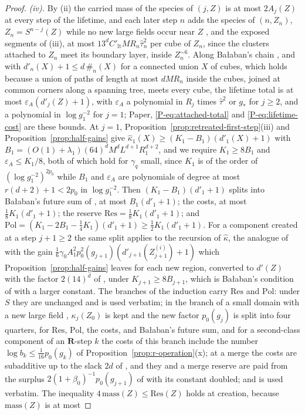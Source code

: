 \documentclass[11pt]{preprint}
\numberwithin{equation}{section}
\theoremstyle{definition}
\theoremstyle{remark}
\theoremstyle{plain}
\begin{document}
\begin{proof}
\emph{(iv).} By (ii) the carried mass of the species of $(j, Z)$ is at most $2A_j(Z)$ at every step of the lifetime, and each later step $n$ adds the species of $(n, Z_n)$, $Z_n = S^{n-j}(Z)$ while no new large fields occur near $Z$ \cite[(1.83), p.~385]{BalabanLFR2}, and the exposed segments of (iii), at most $13^dC'_{\mathrm{lt}}MR_n\hat\tau_n^2$ per cube of $Z_n$, since the clusters attached to $Z_n$ meet its boundary layer, inside $Z_n^{\sim6}$. Along Ba{\l}aban's chain \cite[pp.~384--385]{BalabanLFR2}, and with $d'_n(X) + 1 \leq d\,\#_n(X)$ for a connected union $X$ of cubes, which holds because a union of paths of length at most $dMR_n$ inside the cubes, joined at common corners along a spanning tree, meets every cube, the lifetime total is at most $\varepsilon_A(d'_j(Z) + 1)$, with $\varepsilon_A$ a polynomial in $R_j$ times $\hat\tau^2$ or $g_*$ for $j \geq 2$, and a polynomial in $\log g_1^{-2}$ for $j = 1$; Paper, \eqref{P-eq:attached-total} and \eqref{P-eq:lifetime-cost} are these bounds. At $j = 1$, Proposition~\ref{prop:retreated-first-step}(iii) and Proposition~\ref{prop:half-gains} give $\hat\kappa_1(X) \geq (K_1 - B_1)(d'_1(X) + 1)$ with $B_1 = (O(1) + \lambda_1)(64)^dM^dL^{d+1}R_1^{d+2}$, and we require $K_1 \geq 8B_1$ and $\varepsilon_A \leq K_1/8$, both of which hold for $\gamma_q$ small, since $K_1$ is of the order of $(\log g_1^{-2})^{2p_0}$ while $B_1$ and $\varepsilon_A$ are polynomials of degree at most $r(d + 2) + 1 < 2p_0$ in $\log g_1^{-2}$. Then $(K_1 - B_1)(d'_1 + 1)$ splits into Ba{\l}aban's future sum of \cite[(1.81)]{BalabanLFR2}, at most $B_1(d'_1 + 1)$; the costs, at most $\frac18K_1(d'_1 + 1)$; the reserve $\mathrm{Res} = \frac18K_1(d'_1 + 1)$; and $\mathrm{Pol} = (K_1 - 2B_1 - \frac14K_1)(d'_1 + 1) \geq \frac12K_1(d'_1 + 1)$. For a component created at a step $j + 1 \geq 2$ the same split applies to the recursion of $\hat\kappa$, the analogue of \cite[(1.85), p.~386]{BalabanLFR2} with the gain $\frac16\gamma_0A_1^2p_0^2(g_{j+1})(d'_{j+1}(Z^{(i)}_{j+1}) + 1)$ which Proposition~\ref{prop:half-gains} leaves for each new region, converted to $d'(Z)$ with the factor $2(14)^d$ of \cite[p.~385]{BalabanLFR2}, under $K_{j+1} \geq 8B_{j+1}$, which is Ba{\l}aban's condition of \cite[p.~385]{BalabanLFR2} with a larger constant. The branches of the induction carry $\mathrm{Res}$ and $\mathrm{Pol}$: under $S$ they are unchanged and \cite[(1.83)]{BalabanLFR2} is used verbatim; in the branch of a small domain with a new large field \cite[pp.~385--386]{BalabanLFR2}, $\kappa_j(Z_0)$ is kept and the new factor $p_0(g_j)$ is split into four quarters, for $\mathrm{Res}$, $\mathrm{Pol}$, the costs, and Ba{\l}aban's future sum, and for a second-class component of an $\mathbf R$-step $k$ the costs of this branch include the number $\log b_k \leq \frac{1}{16}p_0(g_k)$ of Proposition~\ref{prop:r-operation}(x); at a merge \cite[(1.86)--(1.88), pp.~386--387]{BalabanLFR2} the costs are subadditive up to the slack $2d$ of \cite[p.~386]{BalabanLFR2}, and they and a merge reserve are paid from the surplus $2(1 + \beta_0)^{-1}p_0(g_{j+1})$ of \cite[(1.88)]{BalabanLFR2} with its constant doubled; and \cite[(1.89)]{BalabanLFR2} is used verbatim. The inequality $4\,\mathrm{mass}(Z) \leq \mathrm{Res}(Z)$ holds at creation, because $\mathrm{mass}(Z)$ is at most 
\end{proof}
\end{document}
